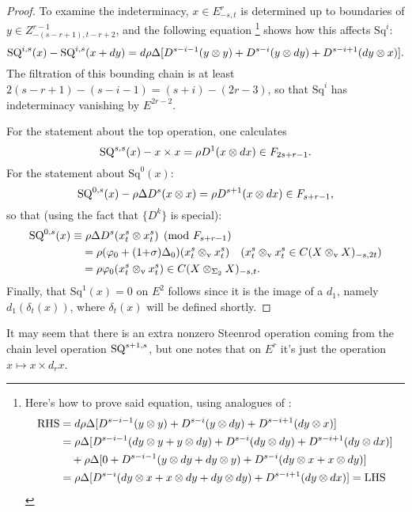 \documentclass[10pt]{article}
\newcommand{\twist}{\sigma}
\newcommand{\Sq}{\mathrm{Sq}}
\begin{document}
\begin{AdamsSSEQ operations final}
\begin{proof}
To examine the indeterminacy, $x\in E^r_{-s,t}$ is determined up to boundaries of $y\in Z^{r-1}_{-(s-r+1),t-r+2}$, and the following equation%
\footnote{Here's how to prove said equation, using analogues of \cite[(1.111),(1.112)]{MR2245560}:
\begin{alignat*}{2}
\textup{RHS}
&=
d\rho\Delta [D^{s-i-1}(y\otimes y)+D^{s-i}(y\otimes dy)+D^{s-i+1}(dy\otimes x)]%
\\
&=
\rho\Delta [D^{s-i-1}(dy\otimes y+y\otimes dy)+D^{s-i}(dy\otimes dy)+D^{s-i+1}(dy\otimes dx)]%
\\
&\ \ \ +
\rho\Delta [0+D^{s-i-1}(y\otimes dy+dy\otimes y)+D^{s-i}(dy\otimes x+x\otimes dy)]%
\\
&=
\rho\Delta [D^{s-i}(dy\otimes x+x\otimes dy+dy\otimes dy)
+D^{s-i+1}(dy\otimes dx)]=\textup{LHS}%
\end{alignat*}} shows how this affects $\Sq^{i}$:
\[\textup{SQ}^{i,s}(x)-\textup{SQ}^{i,s}(x+dy)=d\rho\Delta [D^{s-i-1}(y\otimes y)+D^{s-i}(y\otimes dy)+D^{s-i+1}(dy\otimes x)].\]
The filtration of this bounding chain is at least $2(s-r+1)-(s-i-1)=(s+i)-(2r-3)$, so that $\Sq^i$ has indeterminacy vanishing by $E^{2r-2}$.

For the statement about the top operation, one calculates
\[\textup{SQ}^{s,s}(x)-x\times x=\rho D^{1}(x\otimes dx)\in F_{2s+r-1}.\]
For the statement about $\Sq^0(x)$:
\[\textup{SQ}^{0,s}(x)-\rho\Delta D^s(x\otimes x)=\rho D^{s+1}(x\otimes dx)\in F_{s+r-1},\]
so that (using the fact that $\{D^k\}$ is special):
\begin{alignat*}{2}
\textup{SQ}^{0,s}(x)
&\equiv
\rho\Delta D^s(x^s_t\otimes x^s_t)\pmod{F_{s+r-1}}%
\\
&\quad =
\rho(\phi_0+(1{+}\twist)\Delta_0)(x^s_t\otimes_\textup{v} x^s_t)%
\quad\text{($x^s_t\otimes_\textup{v} x^s_t\in C(X\otimes_\textup{v}X)_{-s,2t}$)}\\
&\quad =
\rho\phi_0(x^s_t\otimes_\textup{v} x^s_t)\in C(X\otimes_{\Sigma_2} X)_{-s,t}.
\end{alignat*}
Finally, that $\Sq^1(x)=0$ on $E^2$ follows since it is the image of a $d_1$, namely $d_1(\delta_t(x))$, where $\delta_t(x)$ will be defined shortly.
\end{proof}
It may seem that there is an extra nonzero Steenrod operation coming from the chain level operation $\textup{SQ}^{s+1,s}$, but one notes that on $E^r$ it's just the operation $x\mapsto x\times d_rx$.


\end{AdamsSSEQ operations final}
\end{document}
